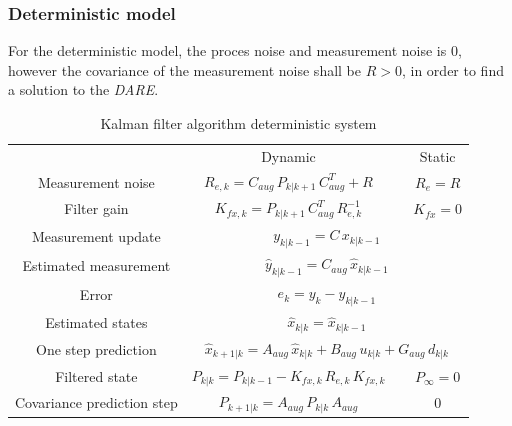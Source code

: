 \subsubsection{Deterministic model}
For the deterministic model, the proces noise and measurement noise is 0, however the covariance of the measurement noise shall be $R>0$, in order to find a solution to the \textit{DARE}.
\begin{table}[H]
    \centering
    \begin{tabular}{c|c|cc}
         & Dynamic &\hspace{10mm} &Static\\
        Measurement noise & $R_{e,k}=C_{aug}\,P_{k|k+1}\,C_{aug}^T+R$ & & $R_{e}=R$\\
        Filter gain & $K_{fx,k}=P_{k|k+1}\,C_{aug}^T\,R_{e,k}^{-1}$ & &$K_{fx}=0$\\
        Measurement update & \multicolumn{3}{c}{$y_{k|k-1}=C\,x_{k|k-1}$} \\
        Estimated measurement & \multicolumn{3}{c}{$\hat{y}_{k|k-1}=C_{aug}\,\hat{x}_{k|k-1}$}\\
        Error & \multicolumn{3}{c}{$e_k=y_k-\hat{y}_{k|k-1}$} \\
        Estimated states & \multicolumn{3}{c}{$\hat{x}_{k|k}=\hat{x}_{k|k-1}$} \\
        One step prediction & \multicolumn{3}{c}{$\hat{x}_{k+1|k}=A_{aug}\,\hat{x}_{k|k}+B_{aug}\,u_{k|k}+G_{aug}\,d_{k|k}$} \\
        Filtered state  & $P_{k|k}=P_{k|k-1}-K_{fx,k}\,R_{e,k}\,K_{fx,k}$ & &$P_{\infty}=0$\\
        Covariance prediction step & $P_{k+1|k}=A_{aug}\,P_{k|k}\,A_{aug}$ & &$0$
    \end{tabular}
    \caption{Kalman filter algorithm deterministic system}
    \label{tab:Kalman_det}
\end{table}
